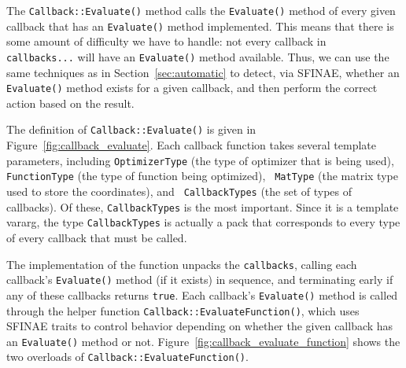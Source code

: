 The {\tt Callback::Evaluate()} method calls the {\tt Evaluate()} method of every
given callback that has an {\tt Evaluate()} method implemented.  This means that
there is some amount of difficulty we have to handle: not every callback in {\tt
callbacks...} will have an {\tt Evaluate()} method available.  Thus, we can use
the same techniques as in Section~\ref{sec:automatic} to detect, via SFINAE,
whether an {\tt Evaluate()} method exists for a given callback, and then perform
the correct action based on the result.

The definition of {\tt Callback::Evaluate()} is given in
Figure~\ref{fig:callback_evaluate}.  Each callback function takes several
template parameters, including {\tt OptimizerType} (the type of optimizer that
is being used), {\tt FunctionType} (the type of function being optimized), {\tt
MatType} (the matrix type used to store the coordinates), and {\tt
CallbackTypes} (the set of types of callbacks).  Of these, {\tt CallbackTypes}
is the most important.  Since it is a template vararg, the
type {\tt CallbackTypes} is actually a pack that corresponds to every type of
every callback that must be called.

The implementation of the function unpacks the {\tt callbacks},
calling each callback's {\tt Evaluate()} method (if it exists) in sequence,
and terminating early if any of these callbacks returns {\tt true}.
Each callback's {\tt Evaluate()} method is called through the helper
function {\tt Callback::EvaluateFunction()},
which uses SFINAE traits to control behavior depending on whether
the given callback has an {\tt Evaluate()} method or not.
Figure~\ref{fig:callback_evaluate_function} shows the two overloads of
{\tt Callback::EvaluateFunction()}.

